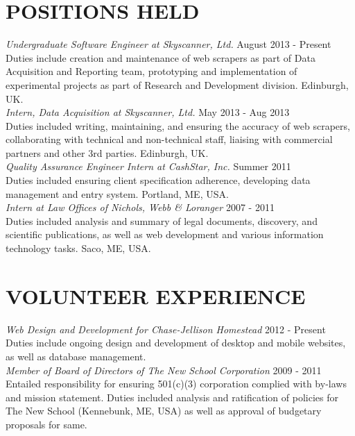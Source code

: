 \documentclass[line, margin]{res}
\begin{document}
\begin{resume}
\section{POSITIONS HELD}
\textit{Undergraduate Software Engineer at Skyscanner, Ltd.} \hfill August 2013 - Present \\
Duties include creation and maintenance of web scrapers 
as part of Data Acquisition and Reporting team, prototyping and implementation of experimental projects as part of Research and Development division. Edinburgh, UK.\\[5pt]
\textit{Intern, Data Acquisition at Skyscanner, Ltd.} \hfill May 2013 - Aug 2013 \\
Duties included writing, maintaining, and ensuring the accuracy of web scrapers, collaborating with technical and non-technical staff, liaising with commercial partners and other 3rd parties. Edinburgh, UK.\\[5pt]
\textit{Quality Assurance Engineer Intern at CashStar, Inc.} \hfill Summer 2011 \\
Duties included ensuring client specification adherence, developing data management and entry system. Portland, ME, USA.\\[5pt]
\textit{Intern at Law Offices of Nichols, Webb \& Loranger} \hfill 2007 - 2011 \\
Duties included analysis and summary of legal documents, discovery, and scientific publications, as well as web development and various information technology tasks. Saco, ME, USA.

\section{VOLUNTEER EXPERIENCE}
\textit{Web Design and Development for Chase-Jellison Homestead} \hfill 2012 - Present \\Duties include ongoing design and development of desktop and mobile websites, as well as database management. \\[5pt]
\textit{Member of Board of Directors of The New School Corporation} \hfill 2009 - 2011 \\
Entailed responsibility for ensuring 501(c)(3) corporation complied with by-laws and mission statement. Duties included analysis and ratification of policies for The New School (Kennebunk, ME, USA) as well as approval of budgetary proposals for same. 


\end{resume}
\end{document}
